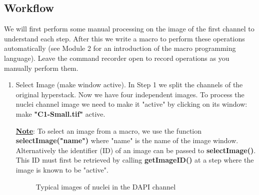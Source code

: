 \documentclass[11pt,a4paper,oneside]{report}
\begin{document}
\subsection{Workflow}

We will first perform some manual processing on the image of the first channel to understand each step. After this we write a macro to perform these operations automatically (see Module 2 for an introduction of the macro programming language). Leave the command recorder open to record operations as you manually perform them.

\begin{enumerate}
    \item Select Image (make window active). 
    In Step 1 we split the channels of the original hyperstack. Now we have four independent images. To process the nuclei channel image we need to make it "active" by clicking on its window: make \textbf{"C1-Small.tif"} active.
    
    \underline{\textbf{Note}}: To select an image from a macro, we use the function \textbf{selectImage("name")} where "name" is the name of the image window. 
    Alternatively the identifier (ID) of an image can be passed to \textbf{selectImage()}. 
    This ID must first be retrieved by calling \textbf{getImageID()} at a step where the image is known to be "active".
    
    \begin{figure}[htbp]
        \centering
        \quad
         \quad
         \quad
         \caption{Typical images of nuclei in the DAPI channel}
         \label{fig:nucleiShapes}
    \end{figure}
    

\end{enumerate}
\end{document}
